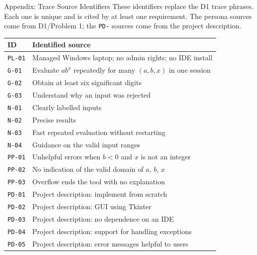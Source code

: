 \documentclass[11pt]{beamer}
\begin{document}
\begin{frame}{Appendix: Trace Source Identifiers}
  \scriptsize
  These identifiers replace the D1 trace phrases. Each one is unique and is
  cited by at least one requirement. The persona sources come from
  D1/Problem 1; the \texttt{PD-} sources come from the project description.
  \begin{center}
  \begin{tabular}{ll}
    \toprule
    ID & Identified source \\
    \midrule
    \texttt{PL-01} & Managed Windows laptop; no admin rights; no IDE install \\
    \texttt{G-01} & Evaluate $ab^{x}$ repeatedly for many $(a,b,x)$ in one session \\
    \texttt{G-02} & Obtain at least six significant digits \\
    \texttt{G-03} & Understand why an input was rejected \\
    \texttt{N-01} & Clearly labelled inputs \\
    \texttt{N-02} & Precise results \\
    \texttt{N-03} & Fast repeated evaluation without restarting \\
    \texttt{N-04} & Guidance on the valid input ranges \\
    \texttt{PP-01} & Unhelpful errors when $b<0$ and $x$ is not an integer \\
    \texttt{PP-02} & No indication of the valid domain of $a$, $b$, $x$ \\
    \texttt{PP-03} & Overflow ends the tool with no explanation \\
    \midrule
    \texttt{PD-01} & Project description: implement from scratch \\
    \texttt{PD-02} & Project description: GUI using Tkinter \\
    \texttt{PD-03} & Project description: no dependence on an IDE \\
    \texttt{PD-04} & Project description: support for handling exceptions \\
    \texttt{PD-05} & Project description: error messages helpful to users \\
    \bottomrule
  \end{tabular}
  \end{center}
\end{frame}
\end{document}
